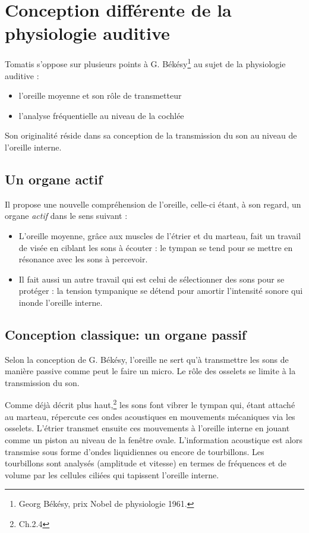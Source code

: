 \section{Conception différente de la physiologie auditive}

Tomatis  s'oppose sur plusieurs points à G. Békésy\footnote{Georg Békésy, prix Nobel de physiologie 1961.} au sujet de la
physiologie auditive : 
\begin{itemize}
\item l'oreille moyenne et son rôle de transmetteur 
\item l'analyse fréquentielle au niveau de la cochlée
\end{itemize}

Son originalité réside dans sa conception de la transmission du son
au niveau de l'oreille interne. 

\subsection{Un organe actif}

Il propose une nouvelle compréhension de l'oreille, celle-ci étant,
à son regard, un organe \emph{actif} %
 dans le sens suivant :
\begin{itemize}
\item L'oreille moyenne, grâce aux muscles de l'étrier et du marteau, fait
un travail de visée en ciblant les sons à écouter : le tympan se tend
pour se mettre en résonance avec les sons à percevoir.
\item Il fait aussi un autre travail qui est celui de sélectionner des sons
pour se protéger : la tension tympanique se détend pour amortir l'intensité
sonore qui inonde l'oreille interne. 
\end{itemize}

\subsection{Conception classique: un organe passif}

Selon la conception de G. Békésy,
l'oreille ne sert qu'à transmettre les sons de manière passive
 comme peut le faire un micro. 
 Le rôle des osselets se limite à la transmission du
son. 

Comme déjà décrit plus haut,\footnote{Ch.2.4} les sons font vibrer le tympan qui,
étant attaché au marteau, répercute ces ondes acoustiques en mouvements mécaniques via les osselets. L'étrier transmet ensuite ces mouvements à l'oreille interne en jouant comme un piston au niveau de la fenêtre
ovale. L'information acoustique est alors transmise sous forme d'ondes
liquidiennes ou encore de tourbillons. Les tourbillons sont analysés (amplitude et vitesse) en termes de fréquences et de volume par les
cellules ciliées qui tapissent l'oreille interne.

